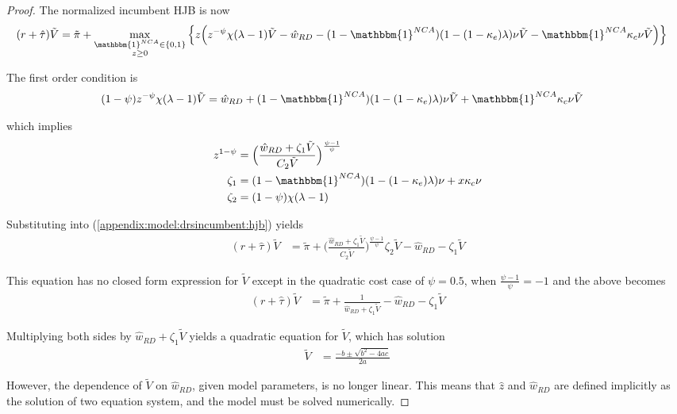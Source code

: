 \documentclass[11pt,english]{article}
\theoremstyle{definition}
\begin{document}
\begin{proof}
	The normalized incumbent HJB is now
	\begin{align}
		(r + \hat{\tau}) \tilde{V} &= \tilde{\pi} + \max_{\substack{\mathbbm{1}^{NCA} \in \{0,1\} \\ z \ge 0}} \Big\{  z \Big( z^{-\psi} \chi (\lambda - 1) \tilde{V} - \hat{w}_{RD} - (1-\mathbbm{1}^{NCA})(1 - (1-\kappa_e) \lambda)\nu \tilde{V} - \mathbbm{1}^{NCA} \kappa_c \nu \tilde{V}  \Big)   \Big\} \label{appendix:model:drsincumbent:hjb}
	\end{align} 
	
	The first order condition is
	\begin{align}
		(1-\psi) z^{-\psi} \chi (\lambda -1)\tilde{V} &= \hat{w}_{RD} + (1-\mathbbm{1}^{NCA}) (1-(1-\kappa_e)\lambda)\nu \tilde{V} + \mathbbm{1}^{NCA} \kappa_c \nu \tilde{V}
	\end{align}
	
	which implies
	\begin{align}
		z^{1-\psi} &= \Big( \frac{\hat{w}_{RD} + \zeta_1\tilde{V}}{C_2\tilde{V}} \Big)^{\frac{\psi -1}{\psi}} \\
		\zeta_1 &= (1-\mathbbm{1}^{NCA})(1-(1-\kappa_e)\lambda)\nu + x\kappa_c\nu \\
		\zeta_2 &= (1-\psi) \chi (\lambda-1)
	\end{align}
	
	Substituting into (\ref{appendix:model:drsincumbent:hjb}) yields
	\begin{align}
		(r + \hat{\tau}) \tilde{V} &= \tilde{\pi} + \Big( \frac{\hat{w}_{RD} + \zeta_1\tilde{V}}{C_2\tilde{V}} \Big)^{\frac{\psi -1}{\psi}} \zeta_2 \tilde{V} - \hat{w}_{RD} - \zeta_1 \tilde{V} 
	\end{align}
	
	This equation has no closed form expression for $\tilde{V}$ except in the quadratic cost case of $\psi = 0.5$, when $\frac{\psi - 1}{\psi} = -1$ and the above becomes
	\begin{align}
		(r + \hat{\tau}) \tilde{V} &= \tilde{\pi} +  \frac{1}{\hat{w}_{RD} + \zeta_1\tilde{V}} - \hat{w}_{RD} - \zeta_1 \tilde{V} 
	\end{align}
	
	Multiplying both sides by $\hat{w}_{RD} + \zeta_1 \tilde{V}$ yields a quadratic equation for $\tilde{V}$, which has solution
	\begin{align}
		\tilde{V} &= \frac{-b \pm \sqrt{b^2 - 4ac}}{2a}
	\end{align}
	
	However, the dependence of $\tilde{V}$ on $\hat{w}_{RD}$, given model parameters, is no longer linear. This means that $\hat{z}$ and $\hat{w}_{RD}$ are defined implicitly as the solution of two equation system, and the model must be solved numerically.	
\end{proof}
\end{document}
